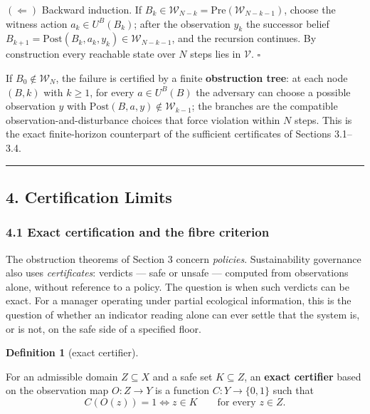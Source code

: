 \documentclass[11pt]{article}
\theoremstyle{definition}
\newtheorem{definition}{Definition}
\begin{document}
\((\Leftarrow)\) Backward induction. If \(B_k\in\mathcal W_{N-k} =
\mathrm{Pre}(\mathcal W_{N-k-1})\), choose the witness action
\(a_k\in U^B(B_k)\); after the observation \(y_k\) the successor belief
\(B_{k+1}=\mathrm{Post}(B_k,a_k,y_k)\in\mathcal W_{N-k-1}\), and the
recursion continues. By construction every reachable state over \(N\)
steps lies in \(\mathcal V\). \ensuremath{\square}

If \(B_0\notin\mathcal W_N\), the failure is certified by a finite
\textbf{obstruction tree}: at each node \((B,k)\) with \(k\ge1\), for
every \(a\in U^B(B)\) the adversary can choose a possible observation
\(y\) with \(\mathrm{Post}(B,a,y)\notin\mathcal W_{k-1}\); the branches
are the compatible observation-and-disturbance choices that force
violation within \(N\) steps. This is the exact finite-horizon
counterpart of the sufficient certificates of Sections 3.1--3.4.

\begin{center}\rule{0.5\linewidth}{0.5pt}\end{center}

\subsection{4. Certification Limits}\label{certification-limits}

\subsubsection{4.1 Exact certification and the fibre
criterion}\label{exact-certification-and-the-fibre-criterion}

The obstruction theorems of Section 3 concern \emph{policies}.
Sustainability governance also uses \emph{certificates}: verdicts
--- safe or unsafe --- computed from observations alone, without
reference to a policy. The question is when such verdicts can be exact.
For a manager operating under partial ecological information, this is
the question of whether an indicator reading alone can ever settle that
the system is, or is not, on the safe side of a specified floor.

\begin{definition}[exact certifier]\label{def:certifier}

For an admissible domain
\(Z \subseteq X\) and a safe set \(K \subseteq Z\), an \textbf{exact
certifier} based on the observation map \(O : Z \to Y\) is a function
\(C : Y \to \{0,1\}\) such that
\[C(O(z)) = 1 \iff z \in K \qquad \text{for every } z \in Z.\]

\end{definition}
\end{document}
